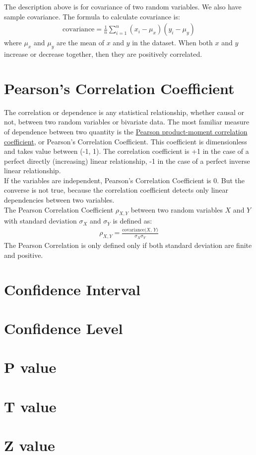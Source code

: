 The description above is for covariance of two random variables. We also have sample covariance. The formula to calculate covariance is:\\
\begin{eqnarray}
\text{covariance} = \frac{1}{n} \sum^{n}_{i =1} (x_i - \mu_x)(y_i - \mu_y)
\label{covariance}
\end{eqnarray}
where $\mu_x$ and $\mu_y$ are the mean of $x$ and $y$ in the dataset. When both $x$ and $y$ increase or decrease together, then they are positively correlated.

\section{Pearson's Correlation Coefficient}

The correlation or dependence is any statistical relationship, whether causal or not, between two random variables or bivariate data. The most familiar measure of dependence between two quantity is the \underline{Pearson product-moment correlation coefficient}, or Pearson's Correlation Coefficient. This coefficient is dimensionless and takes value between (-1, 1). The correlation coefficient is +1 in the case of a perfect directly (increasing) linear relationship, -1 in the case of a perfect inverse linear relationship. \\

If the variables are independent, Pearson's Correlation Coefficient is 0. But the converse is not true, because the correlation coefficient detects only linear dependencies between two variables.\\

The Pearson Correlation Coefficient $\rho_{X,Y}$ between two random variables $X$ and $Y$ with standard deviation $\sigma_X$ and $\sigma_Y$ is defined as:
\begin{eqnarray}
\rho_{X,Y} = \frac{\text{covariance($X$, $Y$)}}{\sigma_X \sigma_Y}
\label{pearson}
\end{eqnarray}
The Pearson Correlation is only defined only if both standard deviation are finite and positive. 


\section{Confidence Interval}

\section{Confidence Level}

\section{P value}

\section{T value}

\section{Z value}




